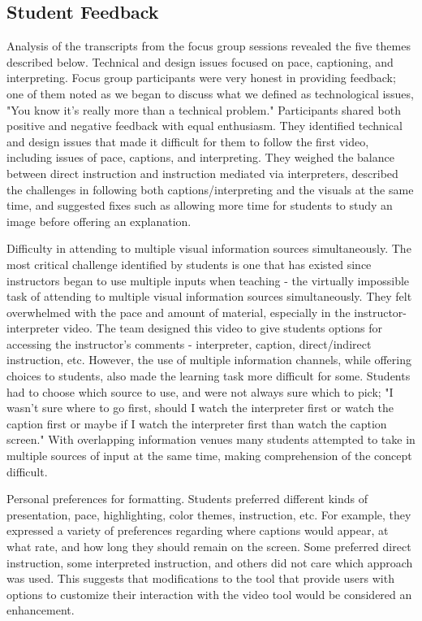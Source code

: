 \documentclass[11.5pt]{sig-alternate} %
\begin{document}
\begin{large}
\subsection*{Student Feedback}

Analysis of the transcripts from the focus group sessions revealed the five themes described below.
Technical and design issues focused on pace, captioning, and interpreting. Focus group participants were very honest in providing feedback; one of them noted as we began to discuss what we defined as technological issues, "You know it’s really more than a technical problem." Participants shared both positive and negative feedback with equal enthusiasm. They identified technical and design issues that made it difficult for them to follow the first video, including issues of pace, captions, and interpreting. They weighed the balance between direct instruction and instruction mediated via interpreters, described the challenges in following both captions/interpreting and the visuals at the same time, and suggested fixes such as allowing more time for students to study an image before offering an explanation.

Difficulty in attending to multiple visual information sources simultaneously. The most critical challenge identified by students is one that has existed since instructors began to use multiple inputs when teaching - the virtually impossible task of attending to multiple visual information sources simultaneously. They felt overwhelmed with the pace and amount of material, especially in the instructor-interpreter video. The team designed this video to give students options for accessing the instructor's comments - interpreter, caption, direct/indirect instruction, etc. However, the use of multiple information channels, while offering choices to students, also made the learning task more difficult for some. Students had to choose which source to use, and were not always sure which to pick; "I wasn’t sure where to go first, should I watch the interpreter first or watch the caption first or maybe if I watch the interpreter first than watch the caption screen." With overlapping information venues many students attempted to take in multiple sources of input at the same time, making comprehension of the concept difficult.

Personal preferences for formatting. Students preferred different kinds of presentation, pace, highlighting, color themes, instruction, etc. For example, they expressed a variety of preferences regarding where captions would appear, at what rate, and how long they should remain on the screen. Some preferred direct instruction, some interpreted instruction, and others did not care which approach was used. This suggests that modifications to the tool that provide users with options to customize their interaction with the video tool would be considered an enhancement.


\end{large}
\end{document}
